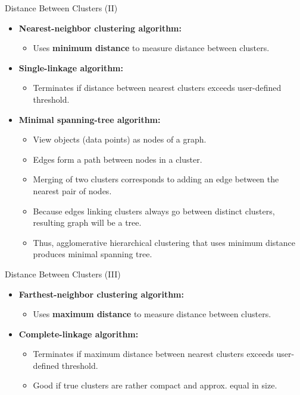 \begin{frame}{Distance Between Clusters (II)}
	\begin{itemize}
		\item \textbf{Nearest-neighbor clustering algorithm:}
		      \begin{itemize}
			      \item Uses \textbf{\color{airforceblue}minimum distance} to measure
			            distance between clusters.
		      \end{itemize}
		\item \textbf{Single-linkage algorithm:}
		      \begin{itemize}
			      \item Terminates if distance between nearest clusters exceeds
			            user-defined threshold.
		      \end{itemize}
		\item \textbf{Minimal spanning-tree algorithm:}
		      \begin{itemize}
			      \item View objects (data points) as nodes of a graph.
			      \item Edges form a path between nodes in a cluster.
			      \item Merging of two clusters corresponds to adding an edge between
			            the nearest pair of nodes.
			      \item Because edges linking clusters always go between distinct
			            clusters,\\
			            resulting graph will be a tree.
			      \item Thus, agglomerative hierarchical clustering that uses minimum
			            distance produces minimal spanning tree.
		      \end{itemize}
	\end{itemize}
\end{frame}

\begin{frame}{Distance Between Clusters (III)}
	\begin{itemize}
		\item \textbf{Farthest-neighbor clustering algorithm:}
		      \begin{itemize}
			      \item Uses \textbf{\color{airforceblue}maximum distance} to measure
			            distance between clusters.
		      \end{itemize}
		\item \textbf{Complete-linkage algorithm:}
		      \begin{itemize}
			      \item Terminates if maximum distance between nearest clusters
			            exceeds user-defined threshold.
			      \item Good if true clusters are rather compact and approx. equal in
			            size.
		      \end{itemize}
	\end{itemize}
\end{frame}

